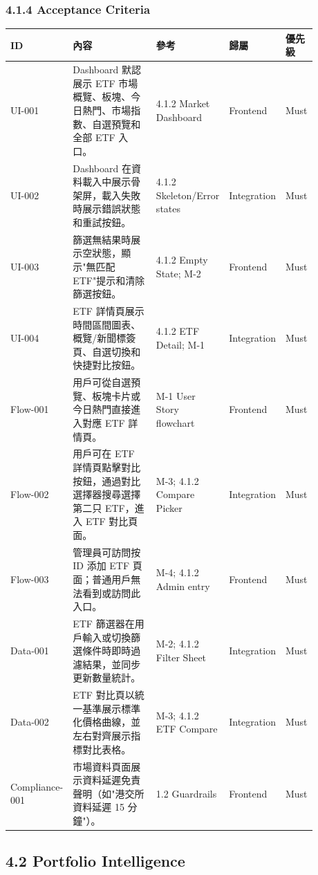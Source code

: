 
\subsubsection{4.1.4 Acceptance Criteria}

\begingroup
\small
\begin{longtable}{L{0.18\linewidth}L{0.30\linewidth}L{0.18\linewidth}L{0.12\linewidth}L{0.10\linewidth}}
\toprule
\textbf{ID} & \textbf{內容} & \textbf{參考} & \textbf{歸屬} & \textbf{優先級} \\
\midrule
UI-001 & Dashboard 默認展示 ETF 市場概覽、板塊、今日熱門、市場指數、自選預覽和全部 ETF 入口。 & 4.1.2 Market Dashboard & Frontend & Must \\
UI-002 & Dashboard 在資料載入中展示骨架屏，載入失敗時展示錯誤狀態和重試按鈕。 & 4.1.2 Skeleton/Error states & Integration & Must \\
UI-003 & 篩選無結果時展示空狀態，顯示"無匹配 ETF"提示和清除篩選按鈕。 & 4.1.2 Empty State; M-2 & Frontend & Must \\
UI-004 & ETF 詳情頁展示時間區間圖表、概覽/新聞標簽頁、自選切換和快捷對比按鈕。 & 4.1.2 ETF Detail; M-1 & Integration & Must \\
Flow-001 & 用戶可從自選預覽、板塊卡片或今日熱門直接進入對應 ETF 詳情頁。 & M-1 User Story flowchart & Frontend & Must \\
Flow-002 & 用戶可在 ETF 詳情頁點擊對比按鈕，通過對比選擇器搜尋選擇第二只 ETF，進入 ETF 對比頁面。 & M-3; 4.1.2 Compare Picker & Integration & Must \\
Flow-003 & 管理員可訪問按 ID 添加 ETF 頁面；普通用戶無法看到或訪問此入口。 & M-4; 4.1.2 Admin entry & Frontend & Must \\
Data-001 & ETF 篩選器在用戶輸入或切換篩選條件時即時過濾結果，並同步更新數量統計。 & M-2; 4.1.2 Filter Sheet & Integration & Must \\
Data-002 & ETF 對比頁以統一基準展示標準化價格曲線，並左右對齊展示指標對比表格。 & M-3; 4.1.2 ETF Compare & Integration & Must \\
Compliance-001 & 市場資料頁面展示資料延遲免責聲明（如"港交所資料延遲 15 分鐘"）。 & 1.2 Guardrails & Frontend & Must \\
\bottomrule
\end{longtable}
\endgroup

\subsection{4.2 Portfolio Intelligence}

